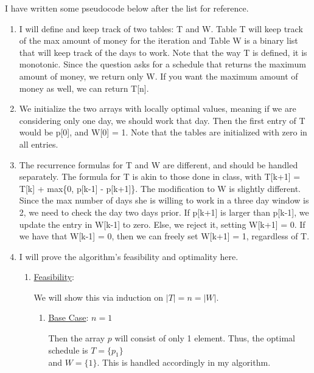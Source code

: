 \begin{solution}
    I have written some pseudocode below after the list for reference.     
    \begin{enumerate}
        \item I will define and keep track of two tables: T and W. Table T will keep track of the max amount of money for the iteration and Table W is a binary list that will keep track of the days to work. Note that the way T is defined, it is monotonic. Since the question asks for a schedule that returns the maximum amount of money, we return only W. If you want the maximum amount of money as well, we can return T[n].

        \item We initialize the two arrays with locally optimal values, meaning if we are considering only one day, we should work that day. Then the first entry of T would be p[0], and W[0] = 1. Note that the tables are initialized with zero in all entries. 

        \item The recurrence formulas for T and W are different, and should be handled separately. The formula for T is akin to those done in class, with T[k+1] = T[k] + max\{0, p[k-1] - p[k+1]\}. The modification to W is slightly different. Since the max number of days she is willing to work in a three day window is 2, we need to check the day two days prior. If p[k+1] is larger than p[k-1], we update the entry in W[k-1] to zero. Else, we reject it, setting W[k+1] = 0. If we have that W[k-1] = 0, then we can freely set W[k+1] = 1, regardless of T. 

        \newpage
        \item I will prove the algorithm's feasibility and optimality here.
        \alignbreak
        \begin{enumerate}[-]
            \item \underline{Feasibility}:
            
            \jump
            We will show this via induction on $|T| = n = |W|$. 
            \begin{enumerate}[-]
                \item \underline{Base Case}: $n = 1$
                
                \hop
                Then the array $p$ will consist of only 1 element. Thus, the optimal schedule is $T = \{p_1\}$\\ and $W = \{ 1\}$. This is handled accordingly in my algorithm.


\end{enumerate}
\end{enumerate}
\end{enumerate}
\end{solution}
